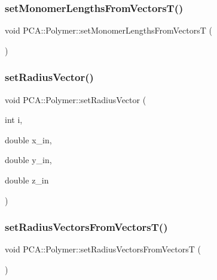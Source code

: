 \hypertarget{class_p_c_a_1_1_polymer_a217cddfa5b9e5bfe68f8e5d0802e2f31}{}\label{class_p_c_a_1_1_polymer_a217cddfa5b9e5bfe68f8e5d0802e2f31} 
\subsubsection{\texorpdfstring{set\+Monomer\+Lengths\+From\+Vectors\+T()}{setMonomerLengthsFromVectorsT()}}
{\footnotesize\ttfamily void P\+C\+A\+::\+Polymer\+::set\+Monomer\+Lengths\+From\+VectorsT (\begin{DoxyParamCaption}{ }\end{DoxyParamCaption})}

\hypertarget{class_p_c_a_1_1_polymer_a0c6e93aa35271b98d92a38afd2b0913d}{}\label{class_p_c_a_1_1_polymer_a0c6e93aa35271b98d92a38afd2b0913d} 
\subsubsection{\texorpdfstring{set\+Radius\+Vector()}{setRadiusVector()}}
{\footnotesize\ttfamily void P\+C\+A\+::\+Polymer\+::set\+Radius\+Vector (\begin{DoxyParamCaption}\item[{int}]{i,  }\item[{double}]{x\+\_\+in,  }\item[{double}]{y\+\_\+in,  }\item[{double}]{z\+\_\+in }\end{DoxyParamCaption})\hspace{0.3cm}{\ttfamily [inline]}}

\hypertarget{class_p_c_a_1_1_polymer_a258f607c38c1a247dd37659b236aa3fa}{}\label{class_p_c_a_1_1_polymer_a258f607c38c1a247dd37659b236aa3fa} 
\subsubsection{\texorpdfstring{set\+Radius\+Vectors\+From\+Vectors\+T()}{setRadiusVectorsFromVectorsT()}}
{\footnotesize\ttfamily void P\+C\+A\+::\+Polymer\+::set\+Radius\+Vectors\+From\+VectorsT (\begin{DoxyParamCaption}{ }\end{DoxyParamCaption})}

